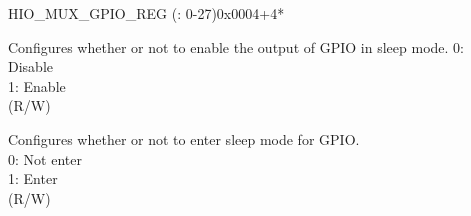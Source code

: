 \begin{register}{H}{IO\_MUX\_GPIO\_REG (: 0-27)}{0x0004+4*}\label{regdesc:IOMUXGPIONREG}
%
%
%
%
%
%
%
%
%
%
%
%
%
%
%
\regnewline%
\begin{regdesc}\begin{reglist}
\label{fielddesc:IOMUXGPIONMCUOE}\item [IO\_MUX\_GPIO\regindex{n}\_MCU\_OE] Configures whether or not to enable the output of GPIO in sleep mode.
0: Disable\\
1: Enable\\ (R/W)
\label{fielddesc:IOMUXGPIONSLPSEL}\item [IO\_MUX\_GPIO\regindex{n}\_SLP\_SEL] Configures whether or not to enter sleep mode for GPIO.\\
0: Not enter\\
1: Enter\\ (R/W)


\end{reglist}
\end{regdesc}
\end{register}

